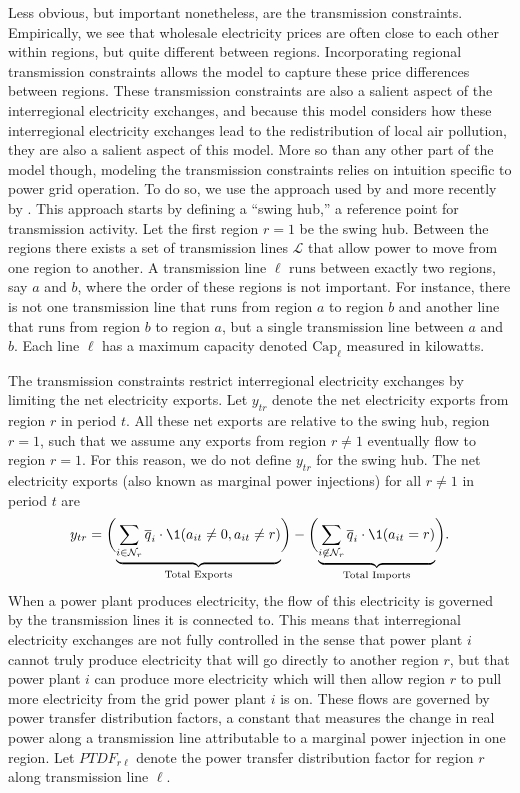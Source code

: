 Less obvious, but important nonetheless, are the transmission constraints. Empirically, we see that wholesale electricity prices are often close to each other within regions, but quite different between regions. Incorporating regional transmission constraints allows the model to capture these price differences between regions. These transmission constraints are also a salient aspect of the interregional electricity exchanges, and because this model considers how these interregional electricity exchanges lead to the redistribution of local air pollution, they are also a salient aspect of this model. More so than any other part of the model though, modeling the transmission constraints relies on intuition specific to power grid operation. To do so, we use the approach used by \cite{bushnell2017strategic} and more recently by \cite{fowlie2021border}. This approach starts by defining a ``swing hub,'' a reference point for transmission activity. Let the first region $r= 1$ be the swing hub. Between the regions there exists a set of transmission lines $\mathcal{L}$ that allow power to move from one region to another. A transmission line $\ell$ runs between exactly two regions, say $a$ and $b$, where the order of these regions is not important. For instance, there is not one transmission line that runs from region $a$ to region $b$ and another line that runs from region $b$ to region $a$, but a single transmission line between $a$ and $b$. Each line $\ell$ has a maximum capacity denoted $\text{Cap}_\ell$ measured in kilowatts. 

The transmission constraints restrict interregional electricity exchanges by limiting the net electricity exports. Let $y_{tr}$ denote the net electricity exports from region $r$ in period $t$. All these net exports are relative to the swing hub, region $r =1$, such that we assume any exports from region $r \neq 1$ eventually flow to region $r = 1$. For this reason, we do not define $y_{tr}$ for the swing hub. The net electricity exports (also known as marginal power injections) for all $r \neq 1$ in period $t$ are
\begin{equation}
    y_{tr} = \biggl(\underbrace{\sum_{i \in \mathcal{N}_r} \overline{q}_i \cdot \1(a_{it} \neq 0, a_{it} \neq r)}_{\text{Total Exports}}  \biggr) - \biggl( \underbrace{\sum_{i\not\in \mathcal{N}_r} \overline{q}_i \cdot \1(a_{it} = r)}_{\text{Total Imports}} \biggr).
\end{equation}
When a power plant produces electricity, the flow of this electricity is governed by the transmission lines it is connected to. This means that interregional electricity exchanges are not fully controlled in the sense that power plant $i$ cannot truly produce electricity that will go directly to another region $r$, but that power plant $i$ can produce more electricity which will then allow region $r$ to pull more electricity from the grid power plant $i$ is on. These flows are governed by power transfer distribution factors, a constant that measures the change in real power along a transmission line attributable to a marginal power injection in one region. Let $PTDF_{r\ell}$ denote the power transfer distribution factor for region $r$ along transmission line $\ell$. 

